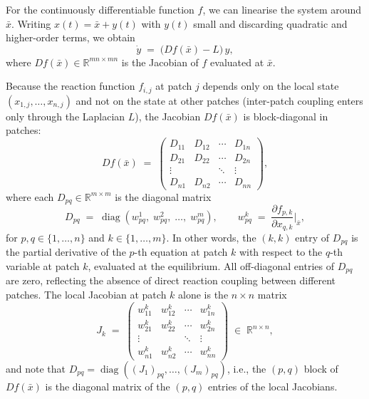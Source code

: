 \documentclass[12pt,a4paper]{article}
\theoremstyle{definition}
\begin{document}
For the continuously differentiable function \(f\), we can linearise the system around \(\bar{x}\). Writing \(x(t) = \bar{x} + y(t)\) with \(y(t)\) small and discarding quadratic and higher-order terms, we obtain
\[
\dot{y}
\;=\;
\bigl(Df(\bar{x}) - L\bigr)\,y,
\]
where \(Df(\bar{x}) \in \mathbb{R}^{mn \times mn}\) is the Jacobian of \(f\) evaluated at \(\bar{x}\). 


Because the reaction function \(f_{i,j}\) at patch \(j\) depends only on the local state \((x_{1,j},\ldots,x_{n,j})\) and not on the state at other patches (inter-patch coupling enters only through the Laplacian \(L\)), the Jacobian \(Df(\bar{x})\) is block-diagonal in patches:
\[
Df(\bar{x})
\;=\;
\begin{pmatrix}
D_{11} & D_{12} & \cdots & D_{1n} \\
D_{21} & D_{22} & \cdots & D_{2n} \\
\vdots & & \ddots & \vdots \\
D_{n1} & D_{n2} & \cdots & D_{nn}
\end{pmatrix},
\]
where each \(D_{pq} \in \mathbb{R}^{m \times m}\) is the diagonal matrix
\[
D_{pq}
\;=\;
\operatorname{diag}
\!\left(
w^{1}_{pq},\; w^{2}_{pq},\; \ldots,\; w^{m}_{pq}
\right),
\qquad
w^{k}_{pq}
\;=\;
\frac{\partial f_{p,k}}{\partial x_{q,k}}\bigg|_{\bar{x}},
\]
for \(p,q \in \{1,\ldots,n\}\) and \(k \in \{1,\ldots,m\}\). In other words, the \((k,k)\) entry of \(D_{pq}\) is the partial derivative of the \(p\)-th equation at patch \(k\) with respect to the \(q\)-th variable at patch \(k\), evaluated at the equilibrium. All off-diagonal entries of \(D_{pq}\) are zero, reflecting the absence of direct reaction coupling between different patches. The local Jacobian at patch \(k\) alone is the \(n \times n\) matrix
\[
J_k
\;=\;
\begin{pmatrix}
w^{k}_{11} & w^{k}_{12} & \cdots & w^{k}_{1n} \\
w^{k}_{21} & w^{k}_{22} & \cdots & w^{k}_{2n} \\
\vdots & & \ddots & \vdots \\
w^{k}_{n1} & w^{k}_{n2} & \cdots & w^{k}_{nn}
\end{pmatrix}
\;\in\; \mathbb{R}^{n \times n},
\]
and note that \(D_{pq} = \operatorname{diag}((J_1)_{pq},\ldots,(J_m)_{pq})\), i.e., the \((p,q)\) block of \(Df(\bar{x})\) is the diagonal matrix of the \((p,q)\) entries of the local Jacobians.
\end{document}
